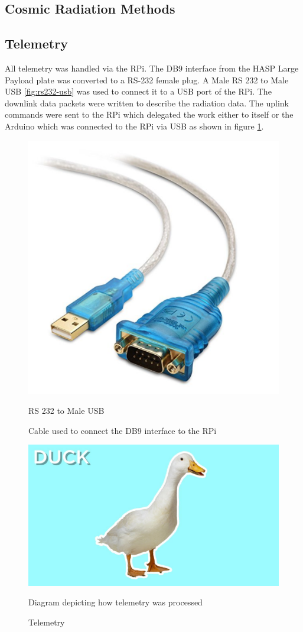 \subsection{Cosmic Radiation Methods}
\label{sec:Rad-Methods}

\subsection{Telemetry}
\label{sec:Telemetry}

All telemetry was handled via the RPi. The DB9 interface from the HASP Large Payload plate was converted to a 
RS-232 female plug. A Male RS 232 to Male USB \ref{fig:rs232-usb} was used to connect it to a USB port of the RPi. 
The downlink data packets were written to describe the radiation data. 
The uplink commands were sent to the RPi which delegated the work either to itself or the Arduino which 
was connected to the RPi via USB as shown in figure \ref{fig:telem-diagram}.

\begin{figure}[h!]
\centering
\begin{minipage}{.5\textwidth}
  \centering
  \includegraphics[width=.4\linewidth]{figures/rs232tousb.png}
  \caption{RS 232 to Male USB}{Cable used to connect the DB9 interface to the RPi}
  \label{fig:rs232tousb}
\end{minipage}%
\begin{minipage}{.5\textwidth}
  \centering
  \includegraphics[width=.4\linewidth]{figures/duck.jpg}
  \caption{Telemetry}{Diagram depicting how telemetry was processed}
  \label{fig:telem-diagram}
\end{minipage}
\end{figure}

